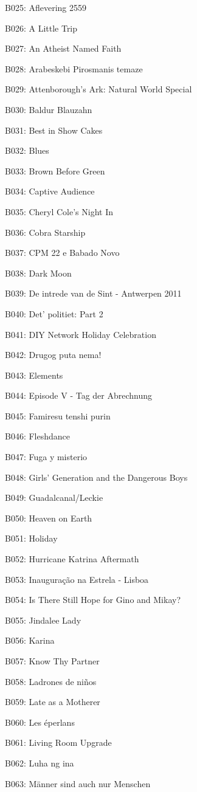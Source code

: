 \documentclass[11pt,a4paper]{article}
\begin{document}
{B025: Aflevering 2559

B026: A Little Trip

B027: An Atheist Named Faith

B028: Arabeskebi Pirosmanis temaze

B029: Attenborough's Ark: Natural World Special

B030: Baldur Blauzahn

B031: Best in Show Cakes

B032: Blues

B033: Brown Before Green

B034: Captive Audience

B035: Cheryl Cole's Night In

B036: Cobra Starship

B037: CPM 22 e Babado Novo

B038: Dark Moon

B039: De intrede van de Sint - Antwerpen 2011

B040: Det' politiet: Part 2

B041: DIY Network Holiday Celebration

B042: Drugog puta nema!

B043: Elements

B044: Episode V - Tag der Abrechnung

B045: Famiresu tenshi purin

B046: Fleshdance

B047: Fuga y misterio

B048: Girls' Generation and the Dangerous Boys

B049: Guadalcanal/Leckie

B050: Heaven on Earth

B051: Holiday

B052: Hurricane Katrina Aftermath

B053: Inauguração na Estrela - Lisboa

B054: Is There Still Hope for Gino and Mikay?

B055: Jindalee Lady

B056: Karina

B057: Know Thy Partner

B058: Ladrones de niños

B059: Late as a Mother\textbf{}er

B060: Les éperlans

B061: Living Room Upgrade

B062: Luha ng ina

B063: Männer sind auch nur Menschen

}
\end{document}
